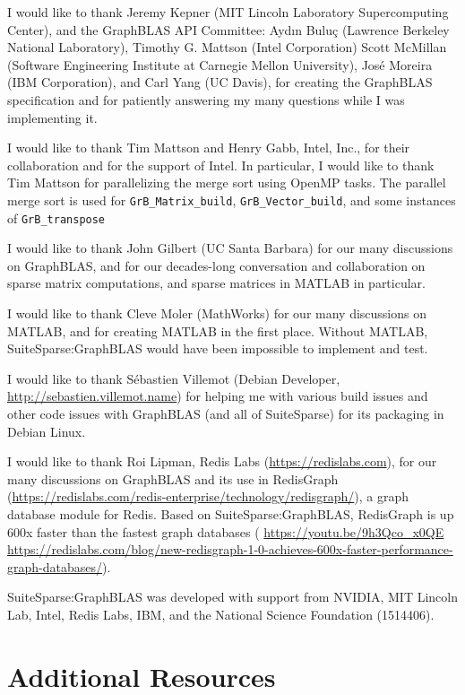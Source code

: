 \documentclass[12pt]{article}
\begin{document}
I would like to thank Jeremy Kepner (MIT Lincoln Laboratory Supercomputing
Center), and the GraphBLAS API Committee: Ayd\i n Bulu\c{c} (Lawrence Berkeley
National Laboratory), Timothy G. Mattson (Intel Corporation) Scott McMillan
(Software Engineering Institute at Carnegie Mellon University), Jos\'e Moreira
(IBM Corporation), and Carl Yang (UC Davis), for creating the GraphBLAS
specification and for patiently answering my many questions while I was
implementing it.

I would like to thank Tim Mattson and Henry Gabb, Intel, Inc., for their
collaboration and for the support of Intel.  In particular, I would like to
thank Tim Mattson for parallelizing the merge sort using OpenMP tasks.  The
parallel merge sort is used for \verb'GrB_Matrix_build',
\verb'GrB_Vector_build', and some instances of \verb'GrB_transpose'

I would like to thank John Gilbert (UC Santa Barbara) for our many discussions
on GraphBLAS, and for our decades-long conversation and collaboration on sparse
matrix computations, and sparse matrices in MATLAB in particular.

I would like to thank Cleve Moler (MathWorks) for our many discussions on
MATLAB, and for creating MATLAB in the first place.  Without MATLAB,
SuiteSparse:GraphBLAS would have been impossible to implement and test.

I would like to thank S\'ebastien Villemot (Debian Developer,
\url{http://sebastien.villemot.name}) for helping me with various build issues
and other code issues with GraphBLAS (and all of SuiteSparse) for its packaging
in Debian Linux.

I would like to thank Roi Lipman, Redis Labs (\url{https://redislabs.com}), for
our many discussions on GraphBLAS and its use in RedisGraph
(\url{https://redislabs.com/redis-enterprise/technology/redisgraph/}), a graph
database module for Redis.  Based on SuiteSparse:GraphBLAS, RedisGraph is up
600x faster than the fastest graph databases ({\footnotesize
\url{https://youtu.be/9h3Qco_x0QE} \newline
\url{https://redislabs.com/blog/new-redisgraph-1-0-achieves-600x-faster-performance-graph-databases/}}).

SuiteSparse:GraphBLAS was developed with support from
NVIDIA, MIT Lincoln Lab, Intel, Redis Labs, IBM,
and the National Science Foundation (1514406).

\section{Additional Resources}
\end{document}
